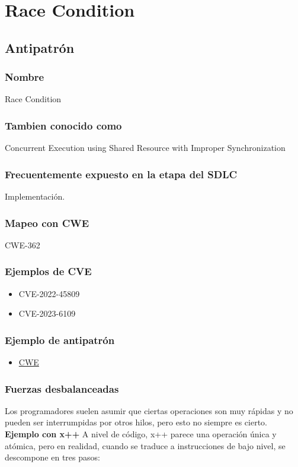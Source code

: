 \chapter{Race Condition}
\section{Antipatrón}
\subsection{Nombre}
Race Condition
\subsection{Tambien conocido como}
Concurrent Execution using Shared Resource with Improper Synchronization 
\subsection{Frecuentemente expuesto en la etapa del SDLC}
Implementación.
\subsection{Mapeo con CWE}
CWE-362
\subsection{Ejemplos de CVE}
\begin{itemize}
    \item CVE-2022-45809
    \item CVE-2023-6109
\end{itemize}
\subsection{Ejemplo de antipatrón}
\begin{itemize}
    \item \href{https://cwe.mitre.org/data/definitions/362.html}{CWE}
\end{itemize}
\subsection{Fuerzas desbalanceadas}
Los programadores suelen asumir que ciertas operaciones son muy rápidas y no pueden ser interrumpidas por otros hilos, pero esto no siempre es cierto.
   \textbf{ Ejemplo con x++}
    A nivel de código, x++ parece una operación única y atómica, pero en realidad, cuando se traduce a instrucciones de bajo nivel, se descompone en tres pasos:
    

